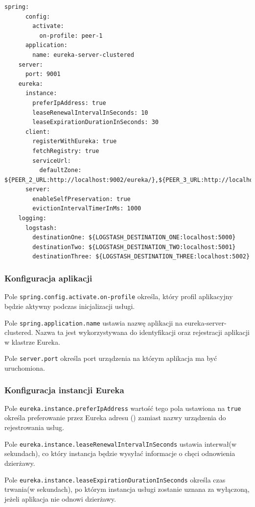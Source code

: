 \begin{lstlisting}[caption=Konfiguracja pierwszego węzła rejestru]
    spring:
      config:
        activate:
          on-profile: peer-1
      application:
        name: eureka-server-clustered
    server:
      port: 9001
    eureka:
      instance:
        preferIpAddress: true
        leaseRenewalIntervalInSeconds: 10
        leaseExpirationDurationInSeconds: 30
      client:
        registerWithEureka: true
        fetchRegistry: true
        serviceUrl:
          defaultZone: ${PEER_2_URL:http://localhost:9002/eureka/},${PEER_3_URL:http://localhost:9003/eureka/}
      server:
        enableSelfPreservation: true
        evictionIntervalTimerInMs: 1000
    logging:
      logstash:
        destinationOne: ${LOGSTASH_DESTINATION_ONE:localhost:5000}
        destinationTwo: ${LOGSTASH_DESTINATION_TWO:localhost:5001}
        destinationThree: ${LOGSTASH_DESTINATION_THREE:localhost:5002}
\end{lstlisting}

\subsubsection{Konfiguracja aplikacji}

Pole \verb|spring.config.activate.on-profile| określa, który profil aplikacyjny będzie aktywny podczas inicjalizacji usługi.

Pole \verb|spring.application.name| ustawia nazwę aplikacji na eureka-server-clustered. Nazwa ta jest wykorzystywana do identyfikacji oraz rejestracji aplikacji w klastrze Eureka.

Pole \verb|server.port| określa port urządzenia na którym aplikacja ma być uruchomiona.

\subsubsection{Konfiguracja instancji Eureka}

Pole \verb|eureka.instance.preferIpAddress| wartość tego pola ustawiona na \verb|true| określa preferowanie przez Eureka adresu  () zamiast nazwy urządzenia do rejestrowania usług.

Pole \verb|eureka.instance.leaseRenewalIntervalInSeconds| ustawia interwał(w sekundach), co który instancja będzie wysyłać informacje o chęci odnowienia dzierżawy.

Pole \verb|eureka.instance.leaseExpirationDurationInSeconds| określa czas trwania(w sekundach), po którym instancja usługi zostanie uznana za wyłączoną, jeżeli aplikacja nie odnowi dzierżawy.

